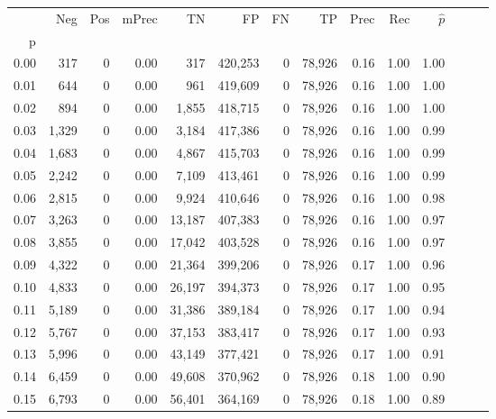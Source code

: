 \begin{tabular}{rrrrrrrrrrrrrr}
\toprule
{} &    Neg &    Pos & mPrec &       TN &       FP &      FN &      TP &  Prec &   Rec & $\hat{p}$ \\
p    &        &        &       &          &          &         &         &       &       &           \\
\midrule
0.00 &    317 &      0 &  0.00 &      317 &  420,253 &       0 &  78,926 &  0.16 &  1.00 &      1.00 \\
0.01 &    644 &      0 &  0.00 &      961 &  419,609 &       0 &  78,926 &  0.16 &  1.00 &      1.00 \\
0.02 &    894 &      0 &  0.00 &    1,855 &  418,715 &       0 &  78,926 &  0.16 &  1.00 &      1.00 \\
0.03 &  1,329 &      0 &  0.00 &    3,184 &  417,386 &       0 &  78,926 &  0.16 &  1.00 &      0.99 \\
0.04 &  1,683 &      0 &  0.00 &    4,867 &  415,703 &       0 &  78,926 &  0.16 &  1.00 &      0.99 \\
0.05 &  2,242 &      0 &  0.00 &    7,109 &  413,461 &       0 &  78,926 &  0.16 &  1.00 &      0.99 \\
0.06 &  2,815 &      0 &  0.00 &    9,924 &  410,646 &       0 &  78,926 &  0.16 &  1.00 &      0.98 \\
0.07 &  3,263 &      0 &  0.00 &   13,187 &  407,383 &       0 &  78,926 &  0.16 &  1.00 &      0.97 \\
0.08 &  3,855 &      0 &  0.00 &   17,042 &  403,528 &       0 &  78,926 &  0.16 &  1.00 &      0.97 \\
0.09 &  4,322 &      0 &  0.00 &   21,364 &  399,206 &       0 &  78,926 &  0.17 &  1.00 &      0.96 \\
0.10 &  4,833 &      0 &  0.00 &   26,197 &  394,373 &       0 &  78,926 &  0.17 &  1.00 &      0.95 \\
0.11 &  5,189 &      0 &  0.00 &   31,386 &  389,184 &       0 &  78,926 &  0.17 &  1.00 &      0.94 \\
0.12 &  5,767 &      0 &  0.00 &   37,153 &  383,417 &       0 &  78,926 &  0.17 &  1.00 &      0.93 \\
0.13 &  5,996 &      0 &  0.00 &   43,149 &  377,421 &       0 &  78,926 &  0.17 &  1.00 &      0.91 \\
0.14 &  6,459 &      0 &  0.00 &   49,608 &  370,962 &       0 &  78,926 &  0.18 &  1.00 &      0.90 \\
0.15 &  6,793 &      0 &  0.00 &   56,401 &  364,169 &       0 &  78,926 &  0.18 &  1.00 &      0.89 \\

\end{tabular}
